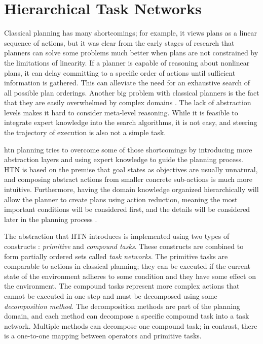 \section{Hierarchical Task Networks}
\label{sec:HTNPlanning}
Classical planning has many shortcomings; for example, 
it views plans as a linear sequence of actions, but it was clear from the early stages of research \cite{NonlinearNaturePlanssacerdoti1975} that planners can solve some problems much better when plans are not constrained by the limitations of linearity. If a planner is capable of reasoning about nonlinear plans, it can delay committing to a specific order of actions until sufficient information is gathered. This can alleviate the need for an exhaustive search of all possible plan orderings. Another big problem with classical planners is the fact that they are easily overwhelmed by complex domains \cite{PracticalPlanningExtendingwilkins1989}. The lack of abstraction levels makes it hard to consider meta-level reasoning. While it is feasible to integrate expert knowledge into the search algorithms, it is not easy, and steering the trajectory of execution is also not a simple task.

\gls{htn} planning tries to overcome some of those shortcomings by introducing more abstraction layers and using expert knowledge to guide the planning process. HTN is based on the premise that goal states as objectives are usually unnatural, and composing abstract actions from smaller concrete sub-actions is much more intuitive. Furthermore, having the domain knowledge organized hierarchically will allow the planner to create plans using action reduction, meaning the most important conditions will be considered first, and the details will be considered later in the planning process \cite{FormalizingPlanningKnowledgeyang1990}.

The abstraction that HTN introduces is implemented using two types of constructs \cite{PANDAFrameworkHierarchicalholler2021}: \textit{primitive} and \textit{compound tasks}. These constructs are combined to form partially ordered sets called \textit{task networks}. The primitive tasks are comparable to actions in classical planning; they can be executed if the current state of the environment adheres to some condition and they have some effect on the environment. The compound tasks represent more complex actions that cannot be executed in one step and must be decomposed using some \textit{decomposition method}. The decomposition methods are part of the planning domain, and each method can decompose a specific compound task into a task network. Multiple methods can decompose one compound task; in contrast, there is a one-to-one mapping between operators and primitive tasks.


